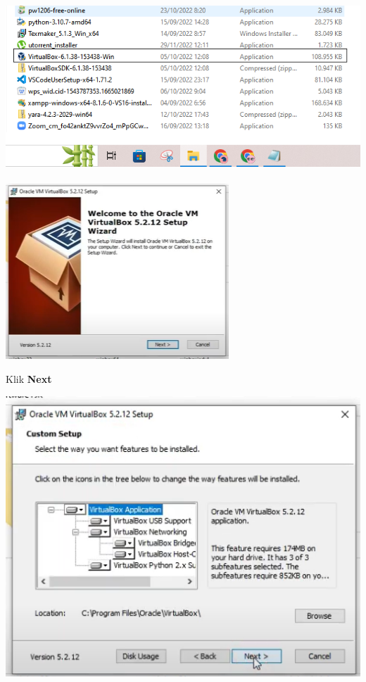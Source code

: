 \documentclass{article}
\begin{document}
\begin{flushleft}
\begin{itemize}
				\begin{center}
					\includegraphics[scale=0.6]{Capture2.1} \\~\\
					\includegraphics[scale=0.8]{Capture} \\       	
        		\end{center}
        		
        		Klik \textbf{Next \>}
        		
        		\begin{center}
        			\includegraphics[scale=0.7]{Screenshot (253)} \\
        		\end{center}
        		

\end{itemize}
\end{flushleft}
\end{document}
